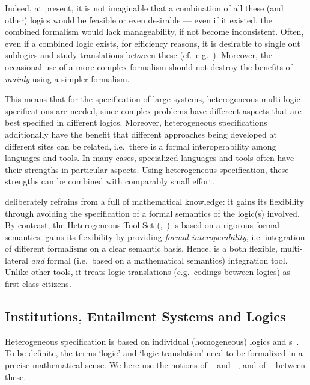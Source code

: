 Indeed, at present, it is not imaginable that a combination of all these (and other)
logics would be feasible or even desirable --- even if it existed, the combined formalism
would lack manageability, if not become inconsistent. Often, even if a combined logic
exists, for efficiency reasons, it is desirable to single out sublogics and study
translations between these (cf.\ e.g.~\cite{Schneider04}).  Moreover, the occasional use
of a more complex formalism should not destroy the benefits of \emph{mainly} using a
simpler formalism.

This means that for the specification of large systems, heterogeneous multi-logic
specifications are needed, since complex problems have
different aspects that are best specified in different logics.  Moreover, heterogeneous
specifications additionally have the benefit that different approaches being developed at
different sites can be related, i.e.\ there is a formal interoperability among languages
and tools.  In many cases, specialized languages and tools often have their strengths in
particular aspects. Using heterogeneous specification, these strengths can be combined
with comparably small effort.

{\omdoc} deliberately refrains from a full {} of mathematical
knowledge: it gains its flexibility through avoiding the specification of a formal
semantics of the logic(s) involved. By contrast, the Heterogeneous Tool Set
({\hets},~\cite{hets06}) is based on a rigorous formal semantics. {\hets} gains its
flexibility by providing \emph{formal interoperability}, i.e. integration of different
formalisms on a clear semantic basis.  Hence, {\hets} is a both flexible, multi-lateral
\emph{and} formal (i.e.\ based on a mathematical semantics) integration tool. Unlike other
tools, it treats logic translations (e.g.\ codings between logics) as first-class
citizens.

\subsection{Institutions, Entailment Systems and Logics}

Heterogeneous specification is based on individual (homogeneous) logics and
{s}~\cite{MossakowskiHabil}. To be definite, the terms `logic'
and `logic translation' need to be formalized in a precise mathematical sense.  We here
use the notions of {\emph{}}~\cite{GoguenBurstall92} and
{\emph{}}~\cite{Meseguer89}, and of
{\emph{}}~\cite{GoguenRosu02} between these.

